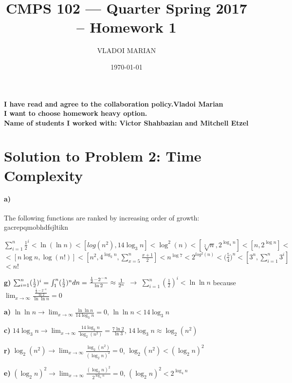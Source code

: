\documentclass[10 pt]{article}
\title{ CMPS 102 --- Quarter  Spring 2017 --  Homework 1}
\author{VLADOI MARIAN}
\date{\today}
\begin{document}
\maketitle



\begin{center}
{\bf I have read and agree to the collaboration policy.Vladoi Marian}\\
{\bf I want to choose homework heavy option.}\\
{\bf Name of students I worked with: Victor Shahbazian and Mitchell Etzel }
\end{center}


\section*{Solution to Problem 2: Time Complexity}
\paragraph{a)}The following functions are ranked by increasing order of growth:
\large  gacrepqmobhdfsjltikn

 $\sum_{i=1}^{n} \frac{1}{2}^{i}  <  \ln (\ln n)  < [log(n^2) , 14\log_3n ] <  \log^2(n) <  [\sqrt[2]{n} , 2^{\log_4 n} ] < [ n, 2^{\log n} ] < $ \\
$  < [n \log n, \log (n!) ]  <  [n^2, 4^{\log_2 n} , \sum_{x=5}^{n} \frac{x+1}{2} ]  <  n^{\log7}  <   2^{log^2(n)}  <  \big (\frac{5}{4}\big ) ^n  <  [ 3^n , \sum_{i=1}^{n} 3^i ] $\\ 
$ < n! $




\textbf{g)}  $\sum_{i=1}^{n}(\frac{1}{2})^i=\intop\nolimits_{1}^{n}(\frac{1}{2})^ndn= \frac{\frac{1}{2}-2^{-n}}{\ln2}\approx\frac{1}{2^n}$ $\rightarrow $ $\sum_{i=1}^{n}(\frac{1}{2})^i<\ln\ln n$ because $\lim_{x\to\infty} \frac{\frac{\frac{1}{2}-2^{-n}}{\ln2}}{\ln\ln n}=0$

\textbf{a)} $\ln\ln n\rightarrow \lim_{x\to\infty}\frac{\ln\ln n}{14\log_{3}n}=0$, $\ln\ln n<14\log_{3}n$

\textbf{c)} $14\log_{3}n \rightarrow \lim_{x\to\infty}\frac{14\log_{3}n}{\log_{2}(n^2)}=\frac{7\ln2}{\ln3}$,  $14\log_{3}n\approx\log_{2}(n^2)$

\textbf{r)} $\log_{2}(n^2)\rightarrow \lim_{x\to\infty}\frac{\log_{2}(n^2)}{(\log_{2}n)^2}=0$, $\log_{2}(n^2)<(\log_{2}n)^2$

\textbf{e)} $(\log_{2}n)^2\rightarrow \lim_{x\to\infty}\frac{(\log_{2}n)^2}{2^{\log_{4}n}}=0$,  $(\log_{2}n)^2<2^{\log_{4}n}$
\end{document}
